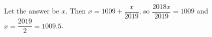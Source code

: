 Let the answer be $x$. Then $x=1009+\dfrac{x}{2019}$, so $\dfrac{2018x}{2019}=1009$ and $x=\dfrac{2019}{2}=\boxed{1009.5}$.
